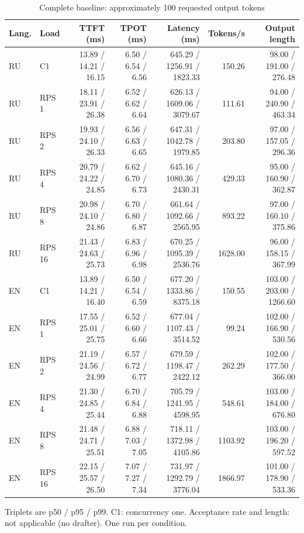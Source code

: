 \begin{table}[htbp]
\centering
\caption{Complete baseline: approximately 100 requested output tokens}
\label{tab:full100}
\begin{singlespace}
\fontsize{10.5}{13}\selectfont
\setlength{\tabcolsep}{4pt}
\renewcommand{\arraystretch}{1.2}
\begin{tabular}{@{}llrrrrr@{}}
\toprule
Lang. & Load & TTFT (ms) & TPOT (ms) & Latency (ms) & Tokens/s & Output length \\
\midrule
RU & C1 & 13.89 / 14.21 / 16.15 & 6.50 / 6.54 / 6.56 & 645.29 / 1256.91 / 1823.33 & 150.26 & 98.00 / 191.00 / 276.48 \\
RU & RPS 1 & 18.11 / 23.91 / 26.38 & 6.52 / 6.62 / 6.64 & 626.13 / 1609.06 / 3079.67 & 111.61 & 94.00 / 240.90 / 463.34 \\
RU & RPS 2 & 19.93 / 24.10 / 26.33 & 6.56 / 6.63 / 6.65 & 647.31 / 1042.78 / 1979.85 & 203.80 & 97.00 / 157.05 / 296.36 \\
RU & RPS 4 & 20.79 / 24.22 / 24.85 & 6.62 / 6.70 / 6.73 & 645.16 / 1080.36 / 2430.31 & 429.33 & 95.00 / 160.90 / 362.87 \\
RU & RPS 8 & 20.98 / 24.10 / 24.86 & 6.70 / 6.80 / 6.87 & 661.64 / 1092.66 / 2565.95 & 893.22 & 97.00 / 160.10 / 375.86 \\
RU & RPS 16 & 21.43 / 24.63 / 25.73 & 6.83 / 6.96 / 6.98 & 670.25 / 1095.39 / 2536.76 & 1628.00 & 96.00 / 158.15 / 367.99 \\
EN & C1 & 13.89 / 14.21 / 16.40 & 6.50 / 6.54 / 6.59 & 677.20 / 1333.86 / 8375.18 & 150.55 & 103.00 / 203.00 / 1266.60 \\
EN & RPS 1 & 17.55 / 25.01 / 25.75 & 6.52 / 6.60 / 6.66 & 677.04 / 1107.43 / 3514.52 & 99.24 & 102.00 / 166.90 / 530.56 \\
EN & RPS 2 & 21.19 / 24.56 / 24.99 & 6.57 / 6.72 / 6.77 & 679.59 / 1198.47 / 2422.12 & 262.29 & 102.00 / 177.50 / 366.00 \\
EN & RPS 4 & 21.30 / 24.85 / 25.44 & 6.70 / 6.84 / 6.88 & 705.79 / 1241.95 / 4598.95 & 548.61 & 103.00 / 184.00 / 676.80 \\
EN & RPS 8 & 21.48 / 24.71 / 25.51 & 6.88 / 7.03 / 7.05 & 718.11 / 1372.98 / 4105.86 & 1103.92 & 103.00 / 196.20 / 597.52 \\
EN & RPS 16 & 22.15 / 25.57 / 26.50 & 7.07 / 7.27 / 7.34 & 731.97 / 1292.79 / 3776.04 & 1866.97 & 101.00 / 178.90 / 533.36 \\
\bottomrule
\end{tabular}
\par\smallskip\raggedright Triplets are p50 / p95 / p99. C1: concurrency one. Acceptance rate and length: not applicable (no drafter). One run per condition.
\end{singlespace}
\end{table}

